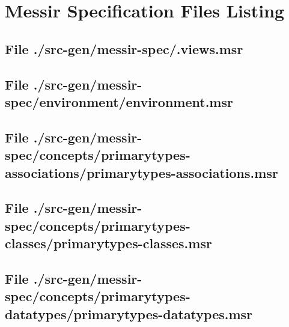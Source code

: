 \chapter{Messir Specification Files Listing}

\section[File /src-gen/messir-spec/.views.msr]{File ./src-gen/messir-spec/.views.msr}
\scriptsize

\normalsize
	
\section[File /src-gen/messir-spec/environment/environment.msr]{File ./src-gen/messir-spec/environment/environment.msr}
\scriptsize

\normalsize
	
\section[File /src-gen/messir-spec/concepts.../primarytypes-associations.msr]{File ./src-gen/messir-spec/concepts/primarytypes-associations/primarytypes-associations.msr}
\scriptsize

\normalsize
	
\section[File /src-gen/messir-spec/concepts/primarytypes-classes/primarytypes-classes.msr]{File ./src-gen/messir-spec/concepts/primarytypes-classes/primarytypes-classes.msr}
\scriptsize

\normalsize
	
\section[File /src-gen/messir-spec/concepts.../primarytypes-datatypes.msr]{File ./src-gen/messir-spec/concepts/primarytypes-datatypes/primarytypes-datatypes.msr}
\scriptsize

\normalsize
	
